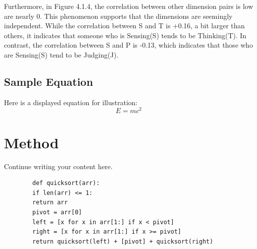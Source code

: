 \documentclass[12pt]{article}
\begin{document}
	Furthermore, in Figure 4.1.4, the correlation between other dimension pairs is low are nearly 0. This phenomenon supports that the dimensions are seemingly independent. While the correlation between S and T is +0.16, a bit larger than others, it indicates that someone who is Sensing(S) tends to be Thinking(T). In contrast, the correlation between S and P is -0.13, which indicates that those who are Sensing(S) tend to be Judging(J).
	
	\subsection{Sample Equation}
	Here is a displayed equation for illustration:
	\[
	E = mc^{2}
	\]
	
	\section{Method}
	Continue writing your content here.
	\begin{lstlisting}
		def quicksort(arr):
		if len(arr) <= 1:
		return arr
		pivot = arr[0]
		left = [x for x in arr[1:] if x < pivot]
		right = [x for x in arr[1:] if x >= pivot]
		return quicksort(left) + [pivot] + quicksort(right)
	\end{lstlisting}
	
	



	\printbibliography[title={References}]
\end{document}
